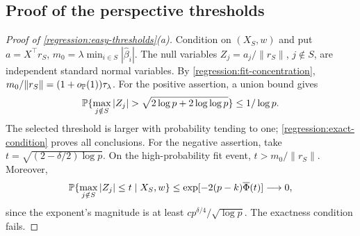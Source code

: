 \subsection{Proof of the perspective thresholds}
\label{app:regression:easy}

\begin{proof}[Proof of \cref{regression:easy-thresholds}(a)]
Condition on $(X_S,w)$ and put $a=X^\top r_S$,
$m_0=\lambda\min_{i\in S}|\widehat\beta_i|$.
The null variables $Z_j=a_j/\|r_S\|$, $j\notin S$, are independent
standard normal variables. By \cref{regression:fit-concentration},
$m_0/\|r_S\|=(1+o_{\mathbb{P}}(1))\tau_\lambda$.
For the positive assertion, a union bound gives
\[
 \Pbb\{\max_{j\notin S}|Z_j|>
                  \sqrt{2\log p+2\log\log p}\}\leq1/\log p.
\]
The selected threshold is larger with probability tending to one;
\cref{regression:exact-condition} proves all conclusions.
For the negative assertion, take
$t=\sqrt{(2-\delta/2)\log p}$. On the high-probability fit event,
$t>m_0/\|r_S\|$. Moreover,
\[
 \mathbb{P}\{\max_{j\notin S}|Z_j|\leq t\mid X_S,w\}
 \leq\exp[-2(p-k)\overline\Phi(t)]\longrightarrow0,
\]
since the exponent's magnitude is at least
$c p^{\delta/4}/\sqrt{\log p}$. The exactness condition fails.
\end{proof}

